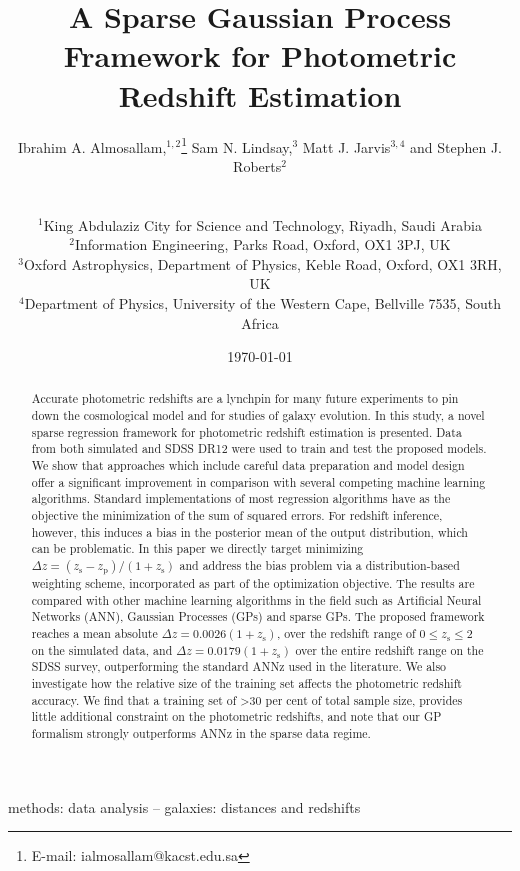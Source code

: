 \documentclass[useAMS,usenatbib,fleqn]{mn2e}
\title[A Sparse GP Framework for Photometric Redshift]{A Sparse Gaussian Process Framework for Photometric Redshift Estimation}
\author[Almosallam et al.]
{\parbox{\textwidth}{Ibrahim A. Almosallam,$^{1,2}$\thanks{E-mail: ialmosallam@kacst.edu.sa} Sam N. Lindsay,$^{3}$ Matt J. Jarvis$^{3,4}$ and Stephen J. Roberts$^{2}$
}
\vspace{0.4cm}\\
\parbox{\textwidth}{
$^1$King Abdulaziz City for Science and Technology, Riyadh, Saudi Arabia\\
$^2$Information Engineering, Parks Road, Oxford, OX1 3PJ, UK\\
$^3$Oxford Astrophysics, Department of Physics, Keble Road, Oxford, OX1 3RH, UK\\
$^4$Department of Physics, University of the Western Cape, Bellville 7535, South Africa\\
}}
\begin{document}
\date{\today}

\pagerange{\pageref{firstpage}--\pageref{lastpage}} 

\maketitle

\label{firstpage}

\begin{abstract}
Accurate photometric redshifts are a lynchpin for many future experiments to pin down the cosmological model and for studies of galaxy evolution. In this study, a novel sparse regression framework for photometric redshift estimation is presented. Data from both simulated and SDSS DR12 were used to train and test the proposed models. We show that approaches which include careful data preparation and model design offer a significant improvement in comparison with several competing machine learning algorithms. Standard implementations of most regression algorithms have as the objective the minimization of the sum of squared errors. For redshift inference, however, this induces a bias in the posterior mean of the output distribution, which can be problematic. In this paper we directly target minimizing $\Delta z = (z_\textrm{s} - z_\textrm{p})/(1+z_\textrm{s})$ and address the bias problem via a distribution-based weighting scheme, incorporated as part of the optimization objective. The results are compared with other machine learning algorithms in the field such as Artificial Neural Networks (ANN), Gaussian Processes (GPs) and sparse GPs. The proposed framework reaches a mean absolute $\Delta z = 0.0026(1+z_\textrm{s})$, over the redshift range of $0 \le z_\textrm{s} \le 2$ on the simulated data, and $\Delta z = 0.0179(1+z_\textrm{s})$ over the entire redshift range on the SDSS survey, outperforming the standard {\sc ANNz} used in the literature. We also investigate how the relative  size of the training set affects the photometric redshift accuracy. We find that a training set of \textgreater 30 per cent of total sample size, provides little additional constraint on the photometric redshifts, and note that our GP formalism strongly outperforms {\sc ANNz} in the sparse data regime.

\end{abstract}

\begin{keywords}
methods: data analysis -- galaxies: distances and redshifts
\end{keywords}
\end{document}
